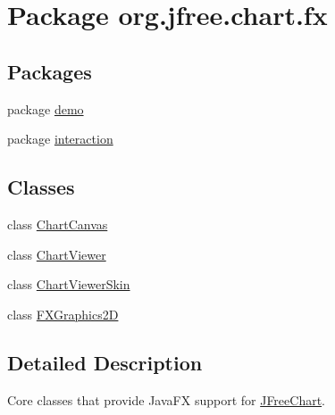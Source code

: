 \hypertarget{namespaceorg_1_1jfree_1_1chart_1_1fx}{}\section{Package org.\+jfree.\+chart.\+fx}
\label{namespaceorg_1_1jfree_1_1chart_1_1fx}
\subsection*{Packages}
\begin{DoxyCompactItemize}
\item 
package \mbox{\hyperlink{namespaceorg_1_1jfree_1_1chart_1_1fx_1_1demo}{demo}}
\item 
package \mbox{\hyperlink{namespaceorg_1_1jfree_1_1chart_1_1fx_1_1interaction}{interaction}}
\end{DoxyCompactItemize}
\subsection*{Classes}
\begin{DoxyCompactItemize}
\item 
class \mbox{\hyperlink{classorg_1_1jfree_1_1chart_1_1fx_1_1_chart_canvas}{Chart\+Canvas}}
\item 
class \mbox{\hyperlink{classorg_1_1jfree_1_1chart_1_1fx_1_1_chart_viewer}{Chart\+Viewer}}
\item 
class \mbox{\hyperlink{classorg_1_1jfree_1_1chart_1_1fx_1_1_chart_viewer_skin}{Chart\+Viewer\+Skin}}
\item 
class \mbox{\hyperlink{classorg_1_1jfree_1_1chart_1_1fx_1_1_f_x_graphics2_d}{F\+X\+Graphics2D}}
\end{DoxyCompactItemize}


\subsection{Detailed Description}
Core classes that provide Java\+FX support for \mbox{\hyperlink{classorg_1_1jfree_1_1chart_1_1_j_free_chart}{J\+Free\+Chart}}. 